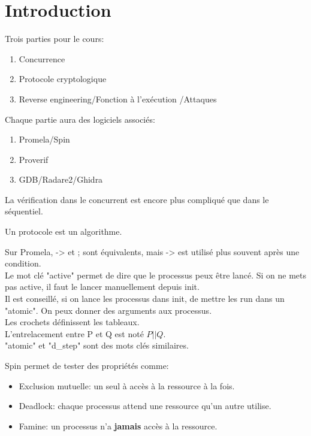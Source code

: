 \section{Introduction}
Trois parties pour le cours:
\begin{enumerate}
	\item Concurrence
	\item Protocole cryptologique
	\item Reverse engineering/Fonction à l'exécution
	/Attaques
\end{enumerate}

Chaque partie aura des logiciels associés:
\begin{enumerate}
	\item Promela/Spin
	\item Proverif
	\item GDB/Radare2/Ghidra
\end{enumerate}

La vérification dans le concurrent est encore plus
compliqué que dans le séquentiel.

Un protocole est un algorithme.

Sur Promela, -> et ; sont équivalents, mais -> est
utilisé plus souvent après une condition.\\
Le mot clé "active" permet de dire que le processus
peux être lancé. Si on ne mets pas active, il faut
le lancer manuellement depuis init.\\
Il est conseillé, si on lance les processus dans
init, de mettre les run dans un "atomic". On peux
donner des arguments aux processus.\\
Les crochets définissent les tableaux.\\
L'entrelacement entre P et Q est noté $P||Q$.\\
"atomic" et "d\_step" sont des mots clés
similaires.

Spin permet de tester des propriétés comme:
\begin{itemize}
	\item Exclusion mutuelle: un seul à accès à la
	ressource à la fois.
	\item Deadlock: chaque processus attend une
	ressource qu'un autre utilise.
	\item Famine: un processus n'a \textbf{jamais}
	accès à la ressource.
\end{itemize}
